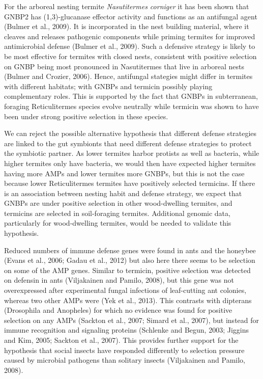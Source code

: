 \documentclass[11pt]{article}
\begin{document}
\begin{sloppypar}
For the arboreal nesting termite \textit{Nasutitermes corniger} it has been shown that GNBP2 has (1,3)-glucanase effector activity and functions as an antifungal agent (Bulmer et al., 2009). 
It is incorporated in the nest building material, where it cleaves and releases pathogenic components while priming termites for improved antimicrobial defense (Bulmer et al., 2009). 
Such a defensive strategy is likely to be most effective for termites with closed nests, consistent with positive selection on GNBP being most pronounced in Nasutitermes that live in arboreal nests (Bulmer and Crozier, 2006). 
Hence, antifungal stategies might differ in termites with different habitats; with GNBPs and termicin possibly playing complementary roles. 
This is supported by the fact that GNBPs in subterranean, foraging Reticulitermes species evolve neutrally while termicin was shown to have been under strong positive selection in these species.
\par
We can reject the possible alternative hypothesis that different defense strategies are linked to the gut symbionts that need different defense strategies to protect the symbiotic partner. 
As lower termites harbor protists as well as bacteria, while higher termites only have bacteria, we would then have expected higher termites having more AMPs and lower termites more GNBPs, but this is not the case because lower Reticulitermes termites have positively selected termicins. 
If there is an association between nesting habit and defense strategy, we expect that GNBPs are under positive selection in other wood-dwelling termites, and termicins are selected in soil-foraging termites. 
Additional genomic data, particularly for wood-dwelling termites, would be needed to validate this hypothesis.
\par
Reduced numbers of immune defense genes were found in ants and the honeybee (Evans et al., 2006; Gadau et al., 2012) but also here there seems to be selection on some of the AMP genes. Similar to termicin, positive selection was detected on defensin in ants (Viljakainen and Pamilo, 2008), but this gene was not overexpressed after experimental fungal infections of leaf-cutting ant colonies, whereas two other AMPs were (Yek et al., 2013). This contrasts with dipterans (Drosophila and Anopheles) for which no evidence was found for positive selection on any AMPs (Sackton et al., 2007; Simard et al., 2007), but instead for immune recognition and signaling proteins (Schlenke and Begun, 2003; Jiggins and Kim, 2005; Sackton et al., 2007). This provides further support for the hypothesis that social insects have responded differently to selection pressure caused by microbial pathogens than solitary insects (Viljakainen and Pamilo, 2008).

\end{sloppypar}
\end{document}
